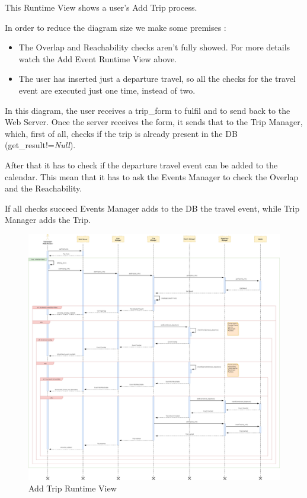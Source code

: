 \newpage
{}
This Runtime View shows a user's Add Trip process.\par
In order to reduce the diagram size we make some premises :
\begin{itemize}
	\setlength{\leftskip}{1cm}
	\item The Overlap and Reachability checks aren’t fully showed. For more details watch the Add Event Runtime View above.
	\item The user has inserted just a departure travel, so all the checks for the travel event are executed just one time, instead of two.
\end{itemize}\par
In this diagram, the user receives a trip\_form to fulfil and to send back to the Web Server.
Once the server receives the form, it sends that to the Trip Manager, which, first of all, checks if the trip is already present in the DB (get\_result!=\emph{Null}).\par
After that it has to check if the departure travel event can be added to the calendar. This mean that it has to ask the Events Manager to check the Overlap and the Reachability.\par
If all checks succeed Events Manager adds to the DB the travel event, while Trip Manager adds the Trip.
\begin{figure}[H]
	\centering
	\includegraphics[scale=0.165]{Images/Runtime/Add_Trip}
	\caption{Add Trip Runtime View}
\end{figure}

